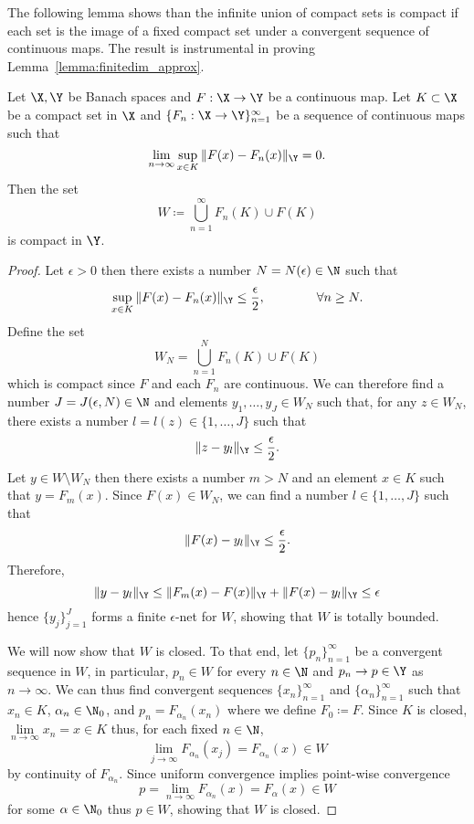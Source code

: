 The following lemma shows than the infinite union of compact sets is compact if each set is the image of a fixed compact set under a convergent sequence of continuous maps. The result is instrumental in proving Lemma~\ref{lemma:finitedim_approx}.

\begin{lemma}
\label{lemma:compact_union}
Let \(\X,\Y\) be Banach spaces and \(F : \X \to \Y\) be a continuous map. Let \(K \subset \X\)
be a compact set in $\X$ and \(\{F_n : \X \to \Y\}_{n=1}^\infty\) be a sequence of continuous maps such that
\[\lim_{n \to \infty} \sup_{x \in K} \|F(x) - F_n(x)\|_\Y = 0.\]
Then the set \[W \coloneqq \bigcup_{n=1}^\infty F_n (K) \cup F(K)\] 
is compact in $\Y$.
\end{lemma}
\begin{proof}
Let \(\epsilon > 0\) then there exists a number \(N = N(\epsilon) \in \N\) such that
\[\sup_{x \in K} \|F(x) - F_n(x)\|_\Y \leq \frac{\epsilon}{2}, \qquad \qquad \forall n \geq N.\]
Define the set
\[W_N = \bigcup_{n=1}^N F_n(K) \cup F(K)\]
which is compact since \(F\) and each \(F_n\) are continuous. We can therefore find a number \(J = J(\epsilon, N) \in \N\) 
and elements \(y_1,\dots,y_J \in W_N\) such that, for any \(z \in W_N\), there exists a number \(l = l(z) \in \{1,\dots,J\}\)
such that 
\[\|z - y_{l}\|_\Y \leq \frac{\epsilon}{2}.\]
Let \(y \in W \setminus W_N\) then there exists a number \(m > N\) and an element \(x \in K\) such that \(y = F_m (x)\).
Since \(F (x) \in W_N\), we can find a number \(l \in \{1,\dots,J\}\) such that
\[\|F (x) - y_l\|_\Y \leq \frac{\epsilon}{2}.\]
Therefore,
\[\|y - y_l\|_\Y \leq \|F_m (x) - F (x) \|_\Y + \|F (x) - y_l\|_\Y \leq \epsilon\]
hence \(\{y_j\}_{j=1}^J\) forms a finite \(\epsilon\)-net for \(W\), showing that \(W\) is totally bounded.

We will now show that \(W\) is closed. To that end, let \(\{p_n\}_{n=1}^\infty\) be a convergent sequence in \(W\), in particular,
\(p_n \in W\) for every \(n \in \N\) and \(p_n \to p \in \Y\) as \(n \to \infty\). We can thus find convergent sequences \(\{x_n\}_{n=1}^\infty\)
and \(\{\alpha_n\}_{n=1}^\infty\) such that \(x_n \in K\), \(\alpha_n \in \N_0\), and 
\(p_n = F_{\alpha_n}(x_n)\) where we define \(F_0 \coloneqq F\). Since \(K\) is closed, \(\lim\limits_{n \to \infty} x_n = x \in K\) thus, for each fixed \(n \in \N\),
\[\lim_{j \to \infty} F_{\alpha_n}(x_j) = F_{\alpha_n}(x) \in W\]
by continuity of \(F_{\alpha_n}\). Since uniform convergence implies point-wise convergence 
\[p = \lim\limits_{n \to \infty} F_{\alpha_n}(x) = F_{\alpha}(x) \in W\]
for some \(\alpha \in \N_0\) thus \(p \in W\), showing that \(W\) is closed.
\end{proof}

